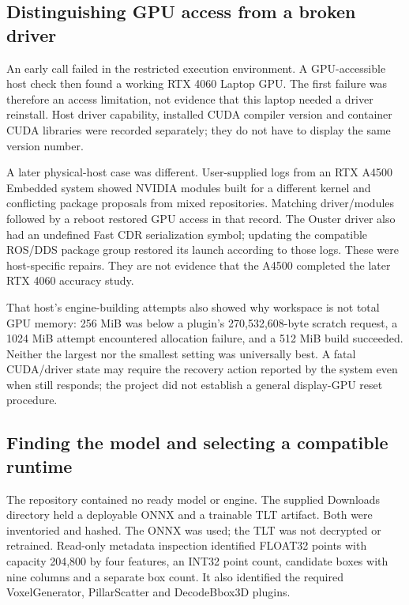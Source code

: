 \documentclass[11pt,a4paper]{article}
\newcommand{\code}[1]{\texttt{\detokenize{#1}}}
\begin{document}
\subsection{Distinguishing GPU access from a broken driver}

An early \code{nvidia-smi} call failed in the restricted execution environment. A GPU-accessible host check then found a working RTX 4060 Laptop GPU. The first failure was therefore an access limitation, not evidence that this laptop needed a driver reinstall. Host driver capability, installed CUDA compiler version and container CUDA libraries were recorded separately; they do not have to display the same version number.

A later physical-host case was different. User-supplied logs from an RTX A4500 Embedded system showed NVIDIA modules built for a different kernel and conflicting package proposals from mixed repositories. Matching driver/modules followed by a reboot restored GPU access in that record. The Ouster driver also had an undefined Fast CDR serialization symbol; updating the compatible ROS/DDS package group restored its launch according to those logs. These were host-specific repairs. They are not evidence that the A4500 completed the later RTX 4060 accuracy study.

That host's engine-building attempts also showed why workspace is not total GPU memory: 256 MiB was below a plugin's 270,532,608-byte scratch request, a 1024 MiB attempt encountered allocation failure, and a 512 MiB build succeeded. Neither the largest nor the smallest setting was universally best. A fatal CUDA/driver state may require the recovery action reported by the system even when \code{nvidia-smi} still responds; the project did not establish a general display-GPU reset procedure.

\subsection{Finding the model and selecting a compatible runtime}

The repository contained no ready model or engine. The supplied Downloads directory held a deployable ONNX and a trainable TLT artifact. Both were inventoried and hashed. The ONNX was used; the TLT was not decrypted or retrained. Read-only metadata inspection identified FLOAT32 points with capacity 204,800 by four features, an INT32 point count, candidate boxes with nine columns and a separate box count. It also identified the required VoxelGenerator, PillarScatter and DecodeBbox3D plugins.
\end{document}
